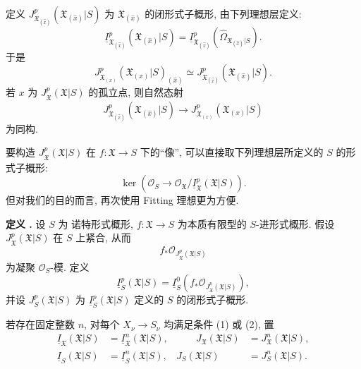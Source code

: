 
定义 $J_{\mathfrak X_{(\widehat{x})}}^p
 (\mathfrak X_{(\widehat{x})}|S)$ 为 $\mathfrak X_{(\widehat{x})}$ 的闭形式子概形, 由下列理想层定义:
\[
\underline I_{\mathfrak X_{(\widehat{x})}}^p
 (\mathfrak X_{(\widehat{x})}|S)
=\underline I_{\mathfrak X_{(\widehat{x})}}^p
 (\widehat\Omega_{\mathfrak X_{(\widehat{x})}|S}).
\]
于是
\[
J_{\mathfrak X_{(x)}}^p(\mathfrak X_{(x)}|S)_{(\widehat{x})}
\simeq
J_{\mathfrak X_{(\widehat{x})}}^p
 (\mathfrak X_{(\widehat{x})}|S).
\]
若 $x$ 为 $J_{\mathfrak X}^p(\mathfrak X|S)$ 的孤立点, 则自然态射
\[
J_{\mathfrak X_{(\widehat{x})}}^p
 (\mathfrak X_{(\widehat{x})}|S)
\longrightarrow
J_{\mathfrak X_{(x)}}^p(\mathfrak X_{(x)}|S)
\]
为同构.

要构造 $J_{\mathfrak X}^p(\mathfrak X|S)$ 在 $f:\mathfrak X\longrightarrow S$ 下的“像”, 可以直接取下列理想层所定义的 $S$ 的形式子概形:
\[
\ker\left(
 \mathcal O_S\longrightarrow
 \mathcal O_{\mathfrak X}/
 \underline I_{\mathfrak X}^p(\mathfrak X|S)
\right).
\]
但对我们的目的而言, 再次使用 Fitting 理想更为方便.


\medskip
\noindent\textbf{定义 .}
设 $S$ 为 诺特形式概形, $f:\mathfrak X\longrightarrow S$ 为本质有限型的 $S$-进形式概形. 假设 $J_{\mathfrak X}^p(\mathfrak X|S)$ 在 $S$ 上紧合, 从而
\[
f_*\mathcal O_{J_{\mathfrak X}^p(\mathfrak X|S)}
\]
为凝聚 $\mathcal O_S$-模. 定义
\[
\underline I_S^p(\mathfrak X|S)
=\underline I_S^0\!\left(
 f_*\mathcal O_{J_{\mathfrak X}^p(\mathfrak X|S)}
\right),
\]
并设 $J_S^p(\mathfrak X|S)$ 为 $\underline I_S^p(\mathfrak X|S)$ 定义的 $S$ 的闭形式子概形.

若存在固定整数 $n$, 对每个 $X_\nu\longrightarrow S_\nu$ 均满足条件 (1) 或 (2), 置
\[
\begin{aligned}
\underline I_{\mathfrak X}(\mathfrak X|S)
 &=\underline I_{\mathfrak X}^n(\mathfrak X|S),
&\qquad
J_{\mathfrak X}(\mathfrak X|S)
 &=J_{\mathfrak X}^n(\mathfrak X|S),\\
\underline I_S(\mathfrak X|S)
 &=\underline I_S^n(\mathfrak X|S),
&
J_S(\mathfrak X|S)
 &=J_S^n(\mathfrak X|S).
\end{aligned}
\]

